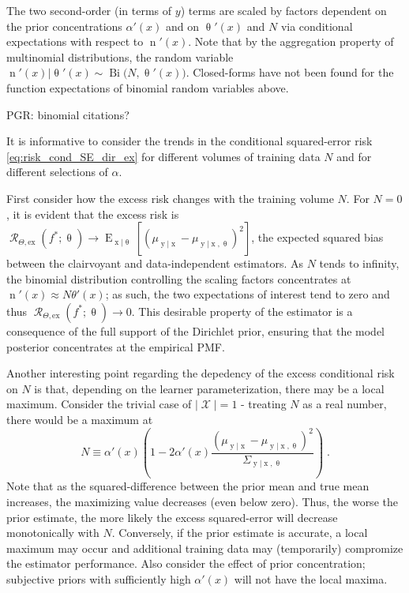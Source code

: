 \documentclass[12pt]{article}
\DeclareMathOperator{\xrm}{\mathrm{x}}
\DeclareMathOperator{\yrm}{\mathrm{y}}
\DeclareMathOperator{\nrm}{\mathrm{n}}
\DeclareMathOperator{\Erm}{\mathrm{E}}
\DeclareMathOperator{\Xcal}{\mathcal{X}}
\DeclareMathOperator{\Rcal}{\mathcal{R}}
\DeclareMathOperator{\Bi}{\mathrm{Bi}}
\begin{document}
The two second-order (in terms of $y$) terms are scaled by factors dependent on the prior concentrations $\alpha'(x)$ and on $\uptheta'(x)$ and $N$ via conditional expectations with respect to $\nrm'(x)$. Note that by the aggregation property of multinomial distributions, the random variable $\nrm'(x) | \uptheta'(x) \sim \Bi \big(N,\uptheta'(x)\big)$. Closed-forms have not been found for the function expectations of binomial random variables above.

PGR: binomial citations?

It is informative to consider the trends in the conditional squared-error risk \eqref{eq:risk_cond_SE_dir_ex} for different volumes of training data $N$ and for different selections of $\alpha$.


First consider how the excess risk changes with the training volume $N$. For $N=0$, it is evident that the excess risk is $\Rcal_{\Theta, \mathrm{ex}}(f^* ; \uptheta) \to \Erm_{\xrm | \uptheta}\left[ \left( \mu_{\yrm | \xrm} - \mu_{\yrm | \xrm,\uptheta} \right)^2 \right]$,  the expected squared bias between the clairvoyant and data-independent estimators. As $N$ tends to infinity, the binomial distribution controlling the scaling factors  concentrates at $\nrm'(x) \approx N \theta'(x)$; as such, the two expectations of interest tend to zero and thus $\Rcal_{\Theta, \mathrm{ex}}(f^* ; \uptheta) \to 0$. This desirable property of the estimator is a consequence of the full support of the Dirichlet prior, ensuring that the model posterior concentrates at the empirical PMF.

Another interesting point regarding the depedency of the excess conditional risk on $N$ is that, depending on the learner parameterization, there may be a local maximum. Consider the trivial case of $|\Xcal| = 1$ - treating $N$ as a real number, there would be a maximum at 
\begin{equation}
N \equiv \alpha'(x) \left( 1 - 2 \alpha'(x) \frac{\left( \mu_{\yrm | \xrm} - \mu_{\yrm | \xrm,\uptheta} \right)^2}{\Sigma_{\yrm | \xrm,\uptheta}} \right) \;.
\end{equation}
Note that as the squared-difference between the prior mean and true mean increases, the maximizing value decreases (even below zero). Thus, the worse the prior estimate, the more likely the excess squared-error will decrease monotonically with $N$. Conversely, if the prior estimate is accurate, a local maximum may occur and additional training data may (temporarily) compromize the estimator performance. Also consider the effect of prior concentration; subjective priors with sufficiently high $\alpha'(x)$ will not have the local maxima.
\end{document}
